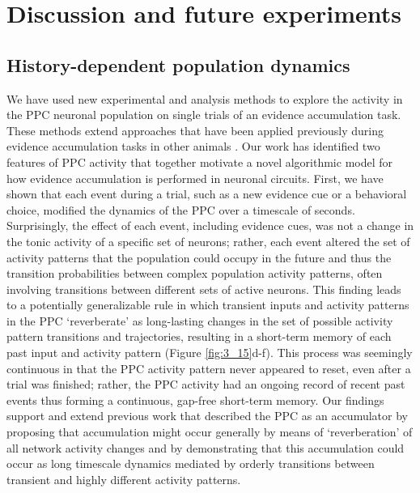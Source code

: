 \chapter{Discussion and future experiments} \label{chapter_4}

\section{History-dependent population dynamics} \label{discussion:general}

We have used new experimental and analysis methods to explore the activity in the PPC neuronal population on single trials of an evidence accumulation task. These methods extend approaches that have been applied previously during evidence accumulation tasks in other animals \citep{Yang:2007in, Gold:2007fo, Raposo:2014df, Raposo:2012ju, Brunton:2013kg, Hanks:2015fy, Scott:2015eh}. Our work has identified two features of PPC activity that together motivate a novel algorithmic model for how evidence accumulation is performed in neuronal circuits. First, we have shown that each event during a trial, such as a new evidence cue or a behavioral choice, modified the dynamics of the PPC over a timescale of seconds. Surprisingly, the effect of each event, including evidence cues, was not a change in the tonic activity of a specific set of neurons; rather, each event altered the set of activity patterns that the population could occupy in the future and thus the transition probabilities between complex population activity patterns, often involving transitions between different sets of active neurons. This finding leads to a potentially generalizable rule in which transient inputs and activity patterns in the PPC ‘reverberate’ as long-lasting changes in the set of possible activity pattern transitions and trajectories, resulting in a short-term memory of each past input and activity pattern (Figure \ref{fig:3_15}d-f). This process was seemingly continuous in that the PPC activity pattern never appeared to reset, even after a trial was finished; rather, the PPC activity had an ongoing record of recent past events thus forming a continuous, gap-free short-term memory. Our findings support and extend previous work that described the PPC as an accumulator \citep{Shadlen:1996ga, Gold:2000hp, Yang:2007in, Hanks:2015fy, Britten:1992wx, Horwitz:1999ws} by proposing that accumulation might occur generally by means of ‘reverberation’ of all network activity changes and by demonstrating that this accumulation could occur as long timescale dynamics mediated by orderly transitions between transient and highly different activity patterns.

